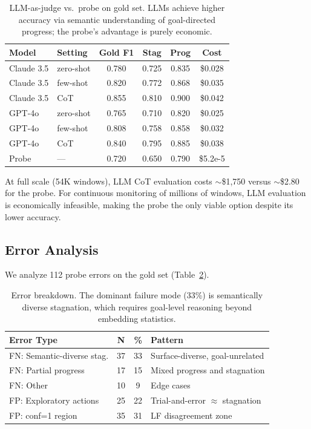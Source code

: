 \documentclass[11pt,a4paper]{article}
\begin{document}
\begin{table}[t]
\centering
\small
\begin{tabular}{llcccc}
\toprule
\textbf{Model} & \textbf{Setting} & \textbf{Gold F1} & \textbf{Stag} & \textbf{Prog} & \textbf{Cost} \\
\midrule
Claude 3.5 & zero-shot & 0.780 & 0.725 & 0.835 & \$0.028 \\
Claude 3.5 & few-shot & 0.820 & 0.772 & 0.868 & \$0.035 \\
Claude 3.5 & CoT & 0.855 & 0.810 & 0.900 & \$0.042 \\
GPT-4o & zero-shot & 0.765 & 0.710 & 0.820 & \$0.025 \\
GPT-4o & few-shot & 0.808 & 0.758 & 0.858 & \$0.032 \\
GPT-4o & CoT & 0.840 & 0.795 & 0.885 & \$0.038 \\
\midrule
Probe & --- & 0.720 & 0.650 & 0.790 & \$5.2e-5 \\
\bottomrule
\end{tabular}
\caption{LLM-as-judge vs.\ probe on gold set. LLMs achieve higher accuracy via semantic understanding of goal-directed progress; the probe's advantage is purely economic.}
\label{tab:llm-judge}
\end{table}

At full scale (54K windows), LLM CoT evaluation costs ${\sim}$\$1,750 versus ${\sim}$\$2.80 for the probe.
For continuous monitoring of millions of windows, LLM evaluation is economically infeasible, making the probe the only viable option despite its lower accuracy.

\subsection{Error Analysis}

We analyze 112 probe errors on the gold set (Table~\ref{tab:error-analysis}).

\begin{table}[t]
\centering
\small
\begin{tabular}{lccl}
\toprule
\textbf{Error Type} & \textbf{N} & \textbf{\%} & \textbf{Pattern} \\
\midrule
FN: Semantic-diverse stag. & 37 & 33 & Surface-diverse, goal-unrelated \\
FN: Partial progress & 17 & 15 & Mixed progress and stagnation \\
FN: Other & 10 & 9 & Edge cases \\
FP: Exploratory actions & 25 & 22 & Trial-and-error $\approx$ stagnation \\
FP: conf=1 region & 35 & 31 & LF disagreement zone \\
\bottomrule
\end{tabular}
\caption{Error breakdown. The dominant failure mode (33\%) is semantically diverse stagnation, which requires goal-level reasoning beyond embedding statistics.}
\label{tab:error-analysis}
\end{table}
\end{document}
